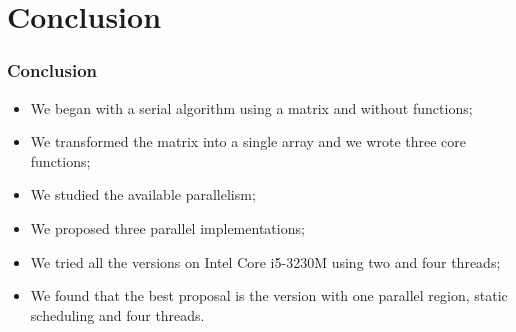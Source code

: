 \documentclass{beamer}
\begin{document}
\section{Conclusion}
\begin{frame}
	\frametitle{Conclusion}
	\begin{itemize}
		\item We began with a serial algorithm using a matrix and without functions;
		\item We transformed the matrix into a single array and we wrote three core functions;
		\item We studied the available parallelism;
		\item We proposed three parallel implementations;
		\item We tried all the versions on Intel Core i5-3230M using two and four threads;
		\item We found that the best proposal is the version with one parallel region, static scheduling and four threads.
	\end{itemize}
\end{frame}
\end{document}
